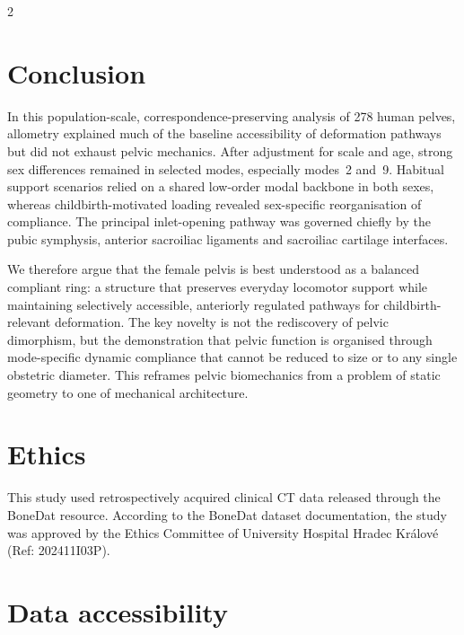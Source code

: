 \documentclass[openacc]{rsproca_new}
\begin{document}
\begin{multicols}{2}

\section{Conclusion}


In this population-scale, correspondence-preserving analysis of 278 human pelves, allometry explained much of the baseline accessibility of deformation pathways but did not exhaust pelvic mechanics. After adjustment for scale and age, strong sex differences remained in selected modes, especially modes~2 and~9. Habitual support scenarios relied on a shared low-order modal backbone in both sexes, whereas childbirth-motivated loading revealed sex-specific reorganisation of compliance. The principal inlet-opening pathway was governed chiefly by the pubic symphysis, anterior sacroiliac ligaments and sacroiliac cartilage interfaces.

We therefore argue that the female pelvis is best understood as a balanced compliant ring: a structure that preserves everyday locomotor support while maintaining selectively accessible, anteriorly regulated pathways for childbirth-relevant deformation. The key novelty is not the rediscovery of pelvic dimorphism, but the demonstration that pelvic function is organised through mode-specific dynamic compliance that cannot be reduced to size or to any single obstetric diameter. This reframes pelvic biomechanics from a problem of static geometry to one of mechanical architecture.

\section*{Ethics}

This study used retrospectively acquired clinical CT data released through the BoneDat resource. According to the BoneDat dataset documentation, the study was approved by the Ethics Committee of University Hospital Hradec Kr\'{a}lov\'{e} (Ref: 202411I03P).

\section*{Data accessibility}


\end{multicols}
\end{document}
